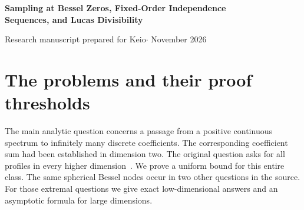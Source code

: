 \documentclass[11pt,a4paper]{article}
\theoremstyle{remark}\newtheorem{remark}[theorem]{Remark}
\numberwithin{equation}{section}
\begin{document}
\begin{center}
{\Large\bfseries\color{ink} Sampling at Bessel Zeros, Fixed-Order Independence\\[3pt] Sequences, and Lucas Divisibility\par}
\vspace{7pt}
{\small Research manuscript prepared for Keio\enspace $\cdot$ November 2026}
\end{center}
\begin{abstract}
We prove the coefficient summability problem of Berdysheva and Berens in every dimension $d\ge3$, with a bound uniform over normalized admissible profiles. Integration of a positive Fourier representation supplies the spectral moment of order $d-1$ needed to sample at spherical Bessel zeros. In the associated discrete Tur\'an problem we prove that the first zero uniquely maximizes in dimensions 2 through 28 and the third zero uniquely maximizes in dimensions 29 through 32. We also determine the limiting maximizing radius and index in high dimension. Two independent applications concern finite structures. A bound on joint extensions of independent sets forbids a prescribed valley in the fixed-order Roller-Coaster conjecture for infinitely many parameter pairs. For very well-covered graphs it implies unimodality through independence number 35 and log-concavity through 33. Connected chordal bipartite examples admit arbitrarily many separated peaks. In Sun's Conjecture~4.4 we classify every allowed parameter. Zero is the sole exception to the two universal divisibility assertions. For every nonzero admissible parameter and every starting index, explicit progressions supply infinitely many witnesses for both Lucas recurrences.
\end{abstract}

\section{The problems and their proof thresholds}
The main analytic question concerns a passage from a positive continuous spectrum to infinitely many discrete coefficients. The corresponding coefficient sum had been established in dimension two. The original question asks for all profiles in every higher dimension~\cite[Open Problem~1]{BB16}. We prove a uniform bound for this entire class. The same spherical Bessel nodes occur in two other questions in the source. For those extremal questions we give exact low-dimensional answers and an asymptotic formula for large dimensions.
\end{document}
